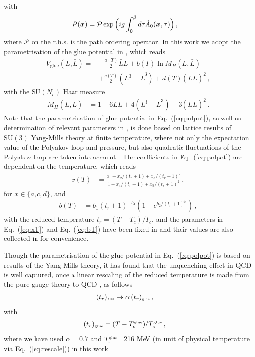 \documentclass[%
reprint,
superscriptaddress,
showpacs,preprintnumbers,
amsmath,amssymb,
aps,
prd,
]{revtex4-1}
\def\Eq#1{Eq.~(\ref{#1})}
\begin{document}
%
with 
%
\begin{align}
{\cal P}(\bm x)&=\mathcal{P}\exp\Big(ig\int_0^{\beta}d\tau \hat A_0(\bm{x},\tau)\Big)\,, \label{eq:Ploop}
\end{align}
%
where $\mathcal{P}$ on the r.h.s. is the path ordering operator. In this work we adopt the parametrisation of the glue potential in \cite{Lo:2013hla}, which reads
%
\begin{align}
V_\text{glue}(L,\bar{L})=& -\frac{a(T)}{2} \bar L L + b(T)\ln M_H(L,\bar{L})\nonumber \\[2ex]
&+ \frac{c(T)}{2} (L^3+\bar L^3) + d(T) (\bar{L} L)^2\,,
\label{eq:polpot}
\end{align}
%
with the $\mathrm{SU}(N_c)$ Haar measure
%
\begin{align}
M_H (L, \bar{L})&= 1 -6 \bar{L}L + 4 (L^3+\bar{L}^3) - 3  (\bar{L}L)^2\,.
\end{align}
%
Note that the parametrisation of glue potential in \Eq{eq:polpot}, as well as determination of relevant parameters in , is done based on lattice results of  $\mathrm{SU}(3)$ Yang-Mills theory at finite temperature, where not only the expectation value of the Polyakov loop and pressure, but also quadratic fluctuations of the Polyakov loop are taken into account \cite{Lo:2013hla}. The coefficients in \Eq{eq:polpot} are dependent on the temperature, which reads
%
\begin{align}
x(T) &= \frac{x_1 + x_2/(t_r+1) + x_3/(t_r+1)^2}{1 + x_4/(t_r+1) + x_5/(t_r+1)^2}\,,\label{eq:xT}
\end{align}
%
for $x\in \{a, c, d\}$, and 
%
\begin{align}
b(T) &=b_1 (t_r+1)^{-b_4}\left (1 -e^{b_2/(t_r+1)^{b_3}} \right)\,,\label{eq:bT}
\end{align}
%
with the reduced temperature $t_r=(T-T_c)/T_c$, and the parameters in \Eq{eq:xT} and \Eq{eq:bT} have been fixed in \cite{Lo:2013hla} and their values are also collected in  for convenience.
	
Though the parametrisation of the glue potential in \Eq{eq:polpot} is based on results of the Yang-Mills theory, it has found that the unquenching effect in QCD is well captured, once a linear rescaling of the reduced temperature is made from the pure gauge theory to QCD \cite{Pawlowski:2010ht, Haas:2013qwp, Herbst:2013ufa}, as follows
%
\begin{align}
(t_r)_{\text{\tiny{YM}}}&\rightarrow \alpha\,(t_r)_{\text{\tiny{glue}}}\,,\label{}
\end{align}
%
with
%
\begin{align}
(t_r)_{\text{\tiny{glue}}}&=
(T-T_c^\text{\tiny{glue}})/T_c^\text{\tiny{glue}}\,,\label{}
\end{align}
%	
where we have used $\alpha=0.7$ and $T_c^\text{\tiny{glue}}$=216 MeV (in unit of physical temperature via \Eq{eq:rescale}) in this work.
	
\end{document}
